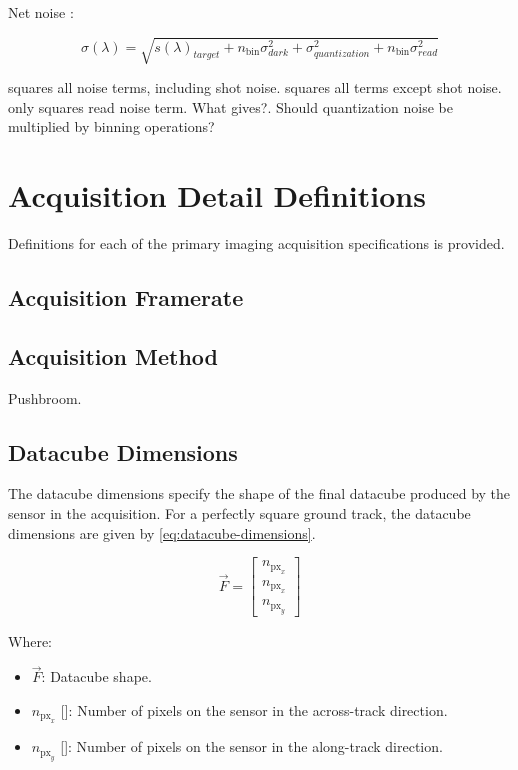 \documentclass{article}
\begin{document}
Net noise \cite{Fiete2001-kz, Chen2012-mt, noauthor_2019-yu}: 

\begin{equation}
    \sigma(\lambda) = \sqrt{ s(\lambda)_{target} + n_{\text{bin}}\sigma_{dark}^2 + \sigma_{quantization}^2 + n_{\text{bin}}\sigma_{read}^2 }
\end{equation}


\cite{Chen2012-mt} squares all noise terms, including shot noise. \cite{Fiete2001-kz} squares all terms except shot noise. \cite{noauthor_2019-yu} only squares read noise term. What gives?. Should quantization noise be multiplied by binning operations?


\section{Acquisition Detail Definitions}
Definitions for each of the primary imaging acquisition specifications is provided.

\subsection{Acquisition Framerate}


\subsection{Acquisition Method}
Pushbroom.

\subsection{Datacube Dimensions} \label{sec:datacube-dimensions}
The datacube dimensions specify the shape of the final datacube produced by the sensor in the acquisition. For a perfectly square ground track, the datacube dimensions are given by \eqref{eq:datacube-dimensions}.

\begin{equation} \label{eq:datacube-dimensions}
\vec{F} = \begin{bmatrix} n_{\text{px}_x}\\ n_{\text{px}_x}\\ n_{\text{px}_y} \end{bmatrix}
\end{equation}

Where:
\begin{itemize}[label={}]
    \item $\vec{F}$: Datacube shape.
    \item $n_{\text{px}_x}$ [\si{\px}]: Number of pixels on the sensor in the across-track direction.
    \item $n_{\text{px}_y}$ [\si{\px}]: Number of pixels on the sensor in the along-track direction.
\end{itemize}
\end{document}
